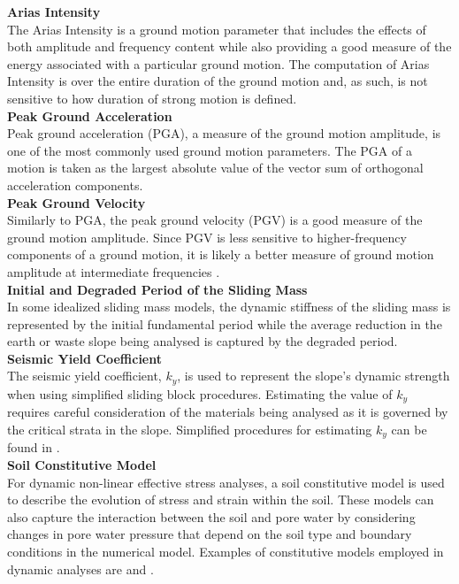 \noindent\textbf{Arias Intensity}\\
The Arias Intensity is a ground motion parameter that includes the effects of both amplitude and frequency content while also providing a good measure of the energy associated with a particular ground motion. The computation of Arias Intensity is over the entire duration of the ground motion and, as such, is not sensitive to how duration of strong motion is defined.\\

\noindent\textbf{Peak Ground Acceleration}\\
Peak ground acceleration (PGA), a measure of the ground motion amplitude, is one of the most commonly used ground motion parameters. The PGA of a motion is taken as the largest absolute value of the vector sum of orthogonal acceleration components.\\

\noindent\textbf{Peak Ground Velocity}\\
Similarly to PGA, the peak ground velocity (PGV) is a good measure of the ground motion amplitude. Since PGV is less sensitive to higher-frequency components of a ground motion, it is likely a better measure of ground motion amplitude at intermediate frequencies \citep{kramer1996geotechnical}.\\

\noindent\textbf{Initial and Degraded Period of the Sliding Mass}\\
In some idealized sliding mass models, the dynamic stiffness of the sliding mass is represented by the initial fundamental period while the average reduction in the earth or waste slope being analysed is captured by the degraded period.\\

\noindent\textbf{Seismic Yield Coefficient}\\
The seismic yield coefficient, $k_y$, is used to represent the slope's dynamic strength when using simplified sliding block procedures. Estimating the value of $k_y$ requires careful consideration of the materials being analysed as it is governed by the critical strata in the slope. Simplified procedures for estimating $k_y$ can be found in \cite{bray1998simplified}.\\ 

\noindent\textbf{Soil Constitutive Model}\\
For dynamic non-linear effective stress analyses, a soil constitutive model is used to describe the evolution of stress and strain within the soil. These models can also capture the interaction between the soil and pore water by considering changes in pore water pressure that depend on the soil type and boundary conditions in the numerical model. Examples of constitutive models employed in dynamic analyses are \cite{yang2003computational, byrne2004numerical, boulanger2017pm4sand} and \cite{boulanger2018pm4silt}.

